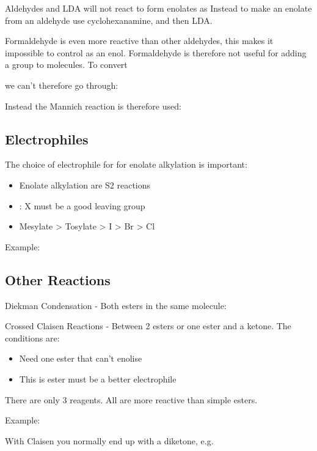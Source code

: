 
Aldehydes and LDA will not react to form enolates as 
Instead to make an enolate from an aldehyde use cyclohexanamine,  and then
LDA.


Formaldehyde is even more reactive than other aldehydes, this makes it impossible
to control as an enol. Formaldehyde is therefore not useful for adding a
 group to molecules. To convert


we can't therefore go through:


Instead the Mannich reaction is therefore used:


\subsection{Electrophiles}

The choice of electrophile for for enolate alkylation is important:
\begin{itemize}
  \item Enolate alkylation are S2 reactions
  \item {}: X must be a good leaving group
  \item Mesylate > Tosylate > I > Br > Cl
\end{itemize}


Example:


\subsection{Other Reactions}

Diekman Condensation - Both esters in the same molecule:


Crossed Claisen Reactions - Between 2 esters or one ester and a ketone. The
conditions are:
\begin{itemize}
  \item Need one ester that can't enolise
  \item This is ester must be a better electrophile
\end{itemize}

There are only 3 reagents. All are more reactive than simple esters.


Example:


With Claisen you normally end up with a diketone, e.g.

